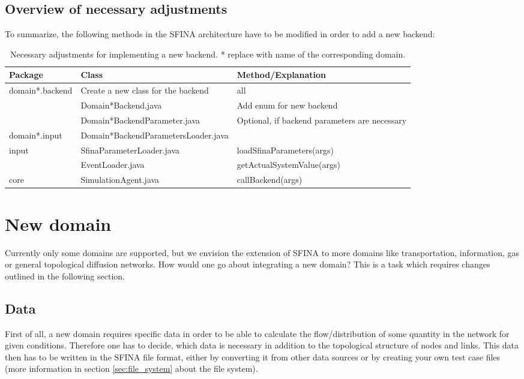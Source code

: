 \documentclass[11pt,fleqn]{book} %
\begin{document}
\subsection{Overview of necessary adjustments}
To summarize, the following methods in the SFINA architecture have to be modified in order to add a new backend:
\begin{table}[h]
	\centering
	\begin{tabular}{|l |l |l|}
	\hline
	\rowcolor{Gray}
	Package & Class & Method/Explanation\\
	\hline
	\multirow{3}{*}{domain*.backend}&Create a new class for the backend & all \\
	\cline{2-3}
	& Domain*Backend.java & Add enum for new backend \\
	\cline{2-3}
	& Domain*BackendParameter.java & \multirow{2}{*}{\parbox{4cm}{Optional, if backend parameters are necessary}}\\
	\cline{1-2}
	domain*.input & Domain*BackendParametersLoader.java & \\
	\hline
	\multirow{2}{*}{input} & SfinaParameterLoader.java & loadSfinaParameters(args)\\
	\cline{2-3}
	& EventLoader.java & getActualSystemValue(args)\\
	\hline
	core & SimulationAgent.java & callBackend(args)\\
	\hline
	\end{tabular}
	\label{table:new_backend}
	\caption{Necessary adjustments for implementing a new backend. * replace with name of the corresponding domain.}
\end{table}

\section{New domain}\label{sec:domain}
Currently only some domains are supported, but we envision the extension of SFINA to more domains like transportation, information, gas or general topological diffusion networks. How would one go about integrating a new domain? This is a task which requires changes outlined in the following section.

\subsection{Data}
First of all, a new domain requires specific data in order to be able to calculate the flow/distribution of some quantity in the network for given conditions. Therefore one has to decide, which data is necessary in addition to the topological structure of nodes and links. This data then has to be written in the SFINA file format, either by converting it from other data sources or by creating your own test case files (more information  in section \ref{sec:file_system} about the file system).
\end{document}
